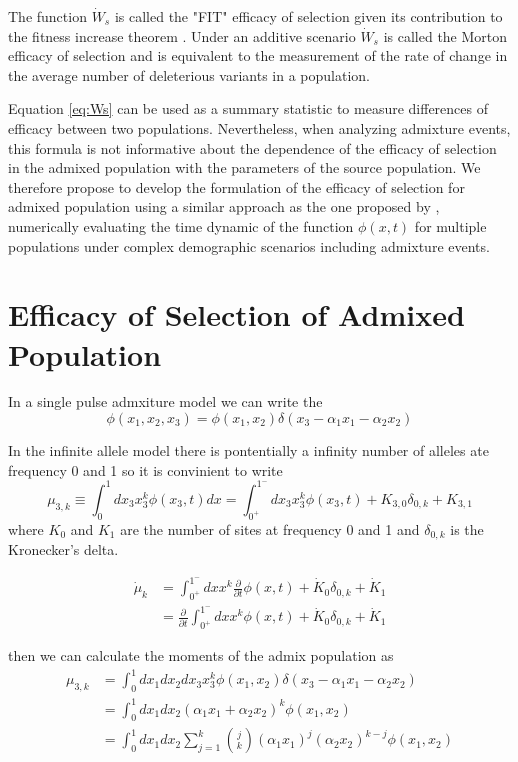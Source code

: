 \documentclass[a4paper, 12pt]{article}
\newcommand{\del}[1]{\ensuremath{\frac{\partial}{\partial #1}}}
\begin{document}
The function $\dot W_s$ is called the "FIT" efficacy of selection given its
contribution to  the fitness increase theorem \citep{Gravel2016,Ewens2004}.
Under an additive  scenario  $\dot W_s$ is called the Morton efficacy
of selection and is equivalent to the measurement of the rate of change in the
average number of deleterious variants in a population.  

Equation \eqref{eq:Ws} can be used as a summary statistic to measure
differences of efficacy between two populations.  Nevertheless, when analyzing
admixture events, this formula is not informative about the dependence of the
efficacy of selection in the admixed population with the parameters of the
source population. We therefore propose to develop the formulation of the
efficacy of selection for admixed population using a similar approach as the
one proposed by \cite{Jouganous2017}, numerically evaluating the time dynamic
of the function $\phi(x,t)$ for multiple populations under complex demographic
scenarios including admixture events.  

\section{Efficacy of Selection of Admixed Population}%
\label{sec:ef_admix} 

In a single pulse admxiture model we can write the 
\[
  \phi(x_1, x_2, x_3) = 
  \phi(x_1, x_2) \delta(x_3 - \alpha_1 x_1 - \alpha_2 x_2) 
\] 

In the infinite allele model there is pontentially a infinity number of alleles
ate frequency 0 and 1 so it is convinient to write 
\[
\mu_{3,k} \equiv \int_{0}^{1}dx_3 x_3^k \phi(x_3,t)dx 
= \int_{0^+}^{1^-}dx_3 x_3^k \phi(x_3,t) + K_{3,0} \delta_{0,k} + K_{3,1}
\]
where $K_0$ and $K_1$ are the number of sites at frequency 0 and 1 and 
$\delta_{0,k}$ is the Kronecker's delta. 

\begin{align}
  \dot \mu_k 
  &= \int_{0^+}^{1^-}dx x^k \del t \phi(x,t) 
  + \dot K_0 \delta_{0,k} + \dot K_1 
  \nonumber \\
  &= \del t \int_{0^+}^{1^-}dx x^k \phi(x,t) 
  + \dot K_0 \delta_{0,k} + \dot K_1 
\end{align}

then we can calculate the moments of the admix population as
\begin{align}
  \mu_{3,k} &= \int_0^1 dx_1 dx_2 dx_3 x_3^k \phi(x_1, x_2) 
  \delta(x_3 - \alpha_1 x_1 - \alpha_2 x_2)
  \nonumber \\
  &= \int_0^1 dx_1 dx_2 (\alpha_1 x_1 +  \alpha_2 x_2) ^k \phi(x_1, x_2)
  \nonumber \\
  &= \int_0^1 dx_1 dx_2 \sum_{j=1}^k\binom{j}{k}
  (\alpha_1 x_1)^j(\alpha_2x_2)^{k -j} \phi(x_1, x_2)
\end{align}
\end{document}
